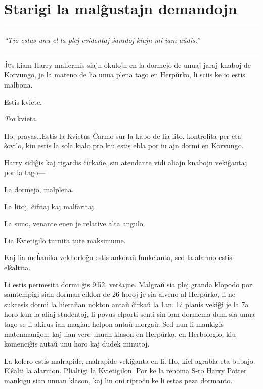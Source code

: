 \chapter{Starigi la malĝustajn demandojn}

\begin{center}\rule{3in}{0.4pt}\end{center}

\emph{``Tio estas unu el la plej evidentaj ŝaradoj kiujn mi iam aŭdis.''}  

\begin{center}\rule{3in}{0.4pt}\end{center}

\lettrine{Ĵ}us kiam Harry malfermis siajn okulojn en la dormejo
de unuaj jaraj knaboj de Korvungo, je la mateno de lia unua plena
tago en Herpŭrko, li sciis ke io estis malbona.

Estis kviete.

\emph{Tro} kvieta.

Ho, pravas\ldots Estis la Kvietus Ĉarmo sur la kapo de lia lito,
kontrolita per eta ŝovilo, kiu estis la sola kialo pro kiu estis ebla
por iu ajn dormi en Korvungo.

Harry sidiĝis kaj rigardis ĉirkaŭe, sin atendante vidi aliajn knabojn vekiĝantaj
por la tago—

La dormejo, malplena.

La litoj, ĉifitaj kaj malfaritaj.

La suno, venante enen je relative alta angulo.

Lia Kvietigilo turnita tute maksimume.

Kaj lia meĥanika vekhorloĝo estis ankoraŭ funkcianta, sed la alarmo
estis elŝaltita.

Li estis permesita dormi ĝis 9:52, verŝajne. Malgraŭ sia plej granda klopodo por
samtempigi sian dorman ciklon de 26-horoj je sia alveno al Herpŭrko, li ne
sukcesis dormi la hieraŭan nokton antaŭ ĉirkaŭ la 1an. Li planis vekiĝi je la 7a
horo kun la aliaj studentoj, li povus elporti senti sin iom dormema dum sia unua
tago se li akirus ian magian helpon antaŭ morgaŭ. Sed nun li mankigis
matenmanĝon, kaj lian vere unuan klason en Herpŭrko, en Herbologio, kiu
komenciĝis autaŭ unu horo kaj dudek minutoj.

La kolero estis malrapide, malrapide vekiĝanta en li. Ho, kiel agrabla
eta bubaĵo. Elŝalti la alarmon. Plialtigi la Kvietigilon. Por ke la
renoma S-ro Harry Potter mankigu sian unuan klason, kaj lin oni riproĉu
ke li estas peza dormanto.

